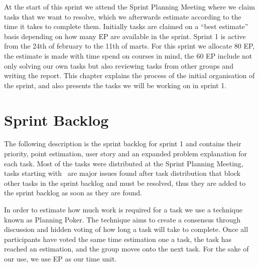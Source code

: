 At the start of this sprint we attend the Sprint Planning Meeting where we claim tasks that we want to resolve, which we afterwards estimate according to the time it takes to complete them.
Initially tasks are claimed on a \enquote{best estimate} basis depending on how many EP are available in the sprint.
Sprint 1 is active from the 24th of february to the 11th of marts.
For this sprint we allocate 80 EP, the estimate is made with time spend on courses in mind, the 60 EP include not only solving our own tasks but also reviewing tasks from other groups and writing the report.
This chapter explains the process of the initial organisation of the sprint, and also presents the tasks we will be working on in sprint 1.

\section{Sprint Backlog}\label{plan1}
The following description is the sprint backlog for sprint 1 and contains their priority, point estimation, user story and an expanded problem explanation for each task.
Most of the tasks were distributed at the Sprint Planning Meeting, tasks starting with \pblocking~are major issues found after task distribution that block other tasks in the sprint backlog and must be resolved, thus they are added to the sprint backlog as soon as they are found.

In order to estimate how much work is required for a task we use a technique known as Planning Poker.
The technique aims to create a consensus through discussion and hidden voting of how long a task will take to complete.
Once all participants have voted the same time estimation one a task, the task has reached an estimation, and the group moves onto the next task.
For the sake of our use, we use EP as our time unit.

